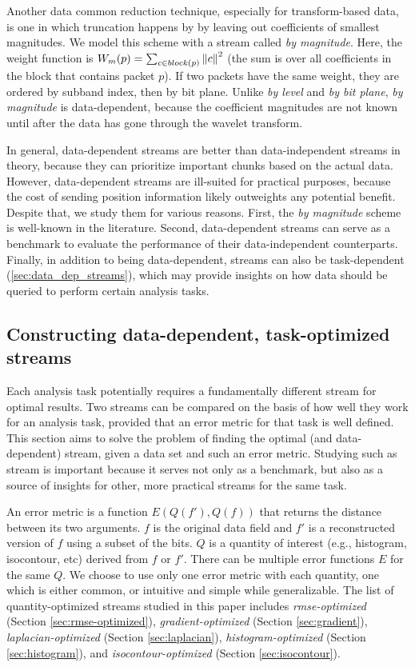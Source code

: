 Another data common reduction technique, especially for transform-based data, is one in which
truncation happens by by leaving out coefficients of smallest magnitudes. We model this scheme with
a stream called \emph{by magnitude}. Here, the weight function is $W_m(p)=\sum_{c\in
block(p)}\left\lVert c\right\rVert^2$ (the sum is over all coefficients in the block that contains packet $p$). If
two packets have the same weight, they are ordered by subband index, then by bit plane. Unlike
\emph{by level} and \emph{by bit plane}, \emph{by magnitude} is data-dependent, because the
coefficient magnitudes are not known until after the data has gone through the wavelet transform.

In general, data-dependent streams are better than data-independent streams in theory, because they
can prioritize important chunks based on the actual data. However, data-dependent streams are
ill-suited for practical purposes, because the cost of sending position information likely
outweights any potential benefit. Despite that, we study them for various reasons. First, the
\emph{by magnitude} scheme is well-known in the literature. Second, data-dependent streams can serve
as a benchmark to evaluate the performance of their data-independent counterparts. Finally, in
addition to being data-dependent, streams can also be task-dependent
(\autoref{sec:data_dep_streams}), which may provide insights on how data should be queried to
perform certain analysis tasks.

\subsection{Constructing data-dependent, task-optimized streams}\label{sec:data_dep_streams}
Each analysis task potentially requires a fundamentally different stream for optimal results. Two
streams can be compared on the basis of how well they work for an analysis task, provided that an
error metric for that task is well defined. This section aims to solve the problem of finding the
optimal (and data-dependent) stream, given a data set and such an error metric. Studying such as
stream is important because it serves not only as a benchmark, but also as a source of insights for
other, more practical streams for the same task.

An error metric is a function $E(Q(f'),Q(f))$ that returns the distance between its two arguments.
$f$ is the original data field and $f'$ is a reconstructed version of $f$ using a subset of the
bits. $Q$ is a quantity of interest (e.g., histogram, isocontour, etc) derived from $f$ or $f'$.
There can be multiple error functions $E$ for the same $Q$. We choose to use only one error metric
with each quantity, one which is either common, or intuitive and simple while generalizable. The
list of quantity-optimized streams studied in this paper includes \emph{rmse-optimized} (Section
\ref{sec:rmse-optimized}), \emph{gradient-optimized} (Section \ref{sec:gradient}),
\emph{laplacian-optimized} (Section \ref{sec:laplacian}), \emph{histogram-optimized} (Section
\ref{sec:histogram}), and \emph{isocontour-optimized} (Section \ref{sec:isocontour}).

